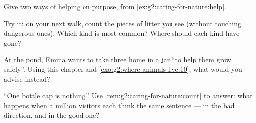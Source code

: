 \begin{exercise}[$\star$]\label{exo:g2:caring-for-nature:7}
Give two ways of helping  on purpose, from
\cref{ex:g2:caring-for-nature:help}.
\end{exercise}

\begin{exercise}[$\star$]\label{exo:g2:caring-for-nature:8}
Try it: on your next walk, count the pieces of litter you see
(without touching dangerous ones). Which kind is most common?
Where should each kind have gone?
\end{exercise}

\begin{exercise}[$\star\star$]\label{exo:g2:caring-for-nature:9}
At the pond, Emma wants to take three  home in a jar ``to
help them grow safely''. Using this chapter and
\cref{exo:g2:where-animals-live:10}, what would you advise
instead?
\end{exercise}

\begin{exercise}[$\star\star$]\label{exo:g2:caring-for-nature:10}
``One bottle cap is nothing.'' Use
\cref{rem:g2:caring-for-nature:count} to answer: what happens
when a million visitors each think the same sentence --- in the
bad direction, and in the good one?
\end{exercise}
